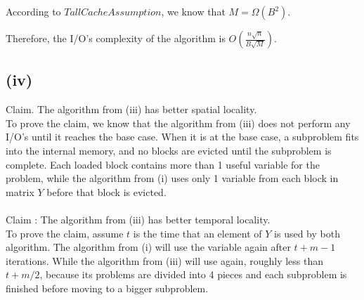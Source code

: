 According to $Tall Cache Assumption$, we know that $M = \Omega(B^2)$.

Therefore, the I/O's complexity of the algorithm is $O(\frac{n\sqrt{n}}{B\sqrt{M}})$.


\subsection*{(iv)}

Claim. The algorithm from (iii) has better spatial locality.
\\

To prove the claim, we know that the algorithm from (iii) does not perform any I/O's until
it reaches the base case. When it is at the base case, a subproblem fits into the internal memory,
and no blocks are evicted until the subproblem is complete. Each loaded block contains more than 1 useful
variable for the problem, while the algorithm from (i) uses only 1 variable from each block in matrix $Y$ before
that block is evicted.
\\\\
Claim : The algorithm from (iii) has better temporal locality.
\\

To prove the claim, assume $t$ is the time that an element of $Y$ is used by both algorithm. The algorithm
from (i) will use the variable again after $t + m-1$ iterations. While the algorithm from (iii) will use again,
roughly less than $ t + m/2$, because its problems are divided into 4 pieces and each subproblem is finished
before moving to a bigger subproblem.
